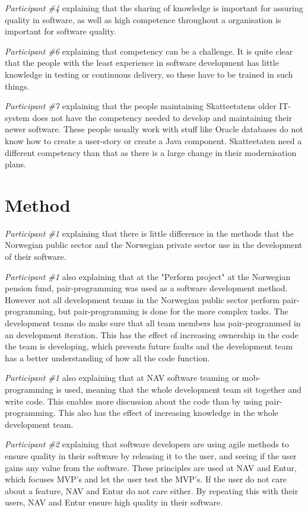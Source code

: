 \textit{Participant \#4} explaining that the sharing of knowledge is important for assuring quality in software, as well as high competence throughout a organisation is important for software quality.  

\textit{Participant \#6} explaining that competency can be a challenge. It is quite clear that the people with the least experience in software development has little knowledge in testing or continuous delivery, so these have to be trained in such things.

\textit{Participant \#7} explaining that the people maintaining Skatteetatens older IT-system does not have the competency needed to develop and maintaining their newer software. These people usually work with stuff like Oracle databases do not know how to create a user-story or create a Java component. Skatteetaten need a different competency than that as there is a large change in their modernisation plans.

\section{Method}
\textit{Participant \#1} explaining that there is little difference in the methods that the Norwegian public sector and the Norwegian private sector use in the development of their software.

\textit{Participant \#1} also explaining that at the "Perform project" at the Norwegian pension fund, pair-programming was used as a software development method. However not all development teams in the Norwegian public sector perform pair-programming, but pair-programming is done for the more complex tasks. The development teams do make sure that all team members has pair-programmed in an development iteration. This has the effect of increasing ownership in the code the team is developing, which prevents future faults and the development team has a better understanding of how all the code function.

\textit{Participant \#1} also explaining that at NAV software teaming or mob-programming is used, meaning that the whole development team sit together and write code. This enables more discussion about the code than by using pair-programming. This also has the effect of increasing knowledge in the whole development team.

\textit{Participant \#2} explaining that software developers are using agile methods to ensure quality in their software by releasing it to the user, and seeing if the user gains any value from the software. These principles are used at NAV and Entur, which focuses MVP's and let the user test the MVP's. If the user do not care about a feature, NAV and Entur do not care either. By repeating this with their users, NAV and Entur ensure high quality in their software.

